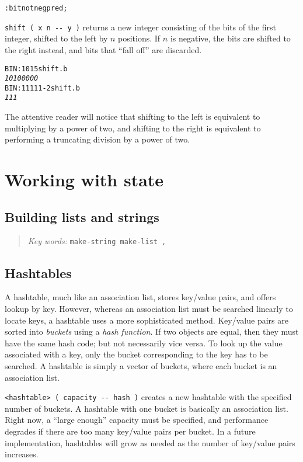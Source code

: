 \documentclass[english]{book}
\newcommand{\chapkeywords}[1]{%
\begin{quote}
\emph{Key words:} \texttt{#1}
\end{quote}
}
\begin{document}
\begin{alltt}
: bitnot neg pred ;
\end{alltt}

\texttt{shift ( x n -{}- y )} returns a new integer consisting of the bits of the first integer, shifted to the left by $n$ positions. If $n$ is negative, the bits are shifted to the right instead, and bits that ``fall off'' are discarded.

\begin{alltt}
BIN: 101 5 shift .b
\emph{10100000}
BIN: 11111 -2 shift .b
\emph{111}
\end{alltt}

The attentive reader will notice that shifting to the left is equivalent to multiplying by a power of two, and shifting to the right is equivalent to performing a truncating division by a power of two.

\chapter{Working with state}

\section{Building lists and strings}

\chapkeywords{make-string make-list ,}

\section{Hashtables}

A hashtable, much like an association list, stores key/value pairs, and offers lookup by key. However, whereas an association list must be searched linearly to locate keys, a hashtable uses a more sophisticated method. Key/value pairs are sorted into \emph{buckets} using a \emph{hash function}. If two objects are equal, then they must have the same hash code; but not necessarily vice versa. To look up the value associated with a key, only the bucket corresponding to the key has to be searched. A hashtable is simply a vector of buckets, where each bucket is an association list.

\texttt{<hashtable> ( capacity -{}- hash )} creates a new hashtable with the specified number of buckets. A hashtable with one bucket is basically an association list. Right now, a ``large enough'' capacity must be specified, and performance degrades if there are too many key/value pairs per bucket. In a future implementation, hashtables will grow as needed as the number of key/value pairs increases.
\end{document}
